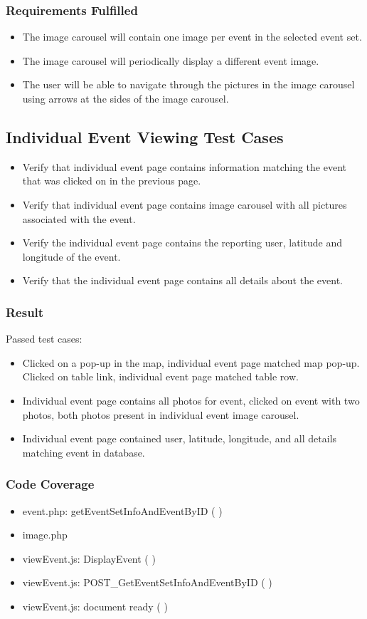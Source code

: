 \subsubsection{Requirements Fulfilled}
\begin{itemize}
\item The image carousel will contain one image per event in the selected event set.
\item The image carousel will periodically display a different event image.
\item The user will be able to navigate through the pictures in the image carousel using arrows at the sides of the image carousel.
\end{itemize}

\subsection{Individual Event Viewing Test Cases}
\begin{itemize}
\item Verify that individual event page contains information matching the event that was clicked on in the previous page. 
\item Verify that individual event page contains image carousel with all pictures associated with the event. 
\item Verify the individual event page contains the reporting user, latitude and longitude of the event.
\item Verify that the individual event page contains all details about the event.
\end{itemize}
\subsubsection{Result}
Passed test cases:
\begin{itemize}
\item Clicked on a pop-up in the map, individual event page matched map pop-up. Clicked on table link, individual event page matched table row. 
\item Individual event page contains all photos for event, clicked on event with two photos, both photos present in individual event image carousel.
\item Individual event page contained user, latitude, longitude, and all details matching event in database.
\end{itemize}
\subsubsection{Code Coverage}
\begin{itemize}
\item event.php: getEventSetInfoAndEventByID ( )
\item image.php
\item viewEvent.js: DisplayEvent ( )
\item viewEvent.js: POST\_GetEventSetInfoAndEventByID ( )
\item viewEvent.js: document ready ( )
\end{itemize}
